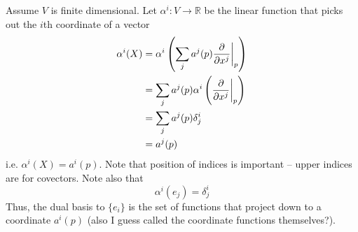Assume \(V\) is finite dimensional. 
%
Let \(\alpha^i \colon V \rightarrow \mathbb{R}\) be the linear function that picks out the \(i\)th coordinate of a vector 
\begin{align}
    \alpha^i(X) &= \alpha^i \left(\sum_j a^j(p) \evalat[\bigg]{\pdv{}{x^j}}{p} \right) \\ 
    &= \sum_j a^j(p) \alpha^i \left(\evalat[\bigg]{\pdv{}{x^j}}{p} \right) \\
    &= \sum_j a^j(p) \delta_j^i \\
    &= a^j(p)
\end{align}
%
i.e. \(\alpha^i(X) = a^i(p)\).
%
Note that position of indices is important -- upper indices are for covectors.
%
Note also that
\[
    \alpha^i(e_j) = \delta_j^i    
\]
%
Thus, the dual basis to \(\{e_i\}\) is the set of functions that project down to a coordinate \(a^i(p)\) (also I guess called the coordinate functions themselves?).
